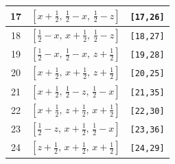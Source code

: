 \documentclass[fleqn,8pt]{jsarticle}
\begin{document}
\begin{longtable}{ccc}
17 & $\left[ x + \frac{1}{2},\, \frac{1}{2} - x,\, \frac{1}{2} - z \right]$ & {\tt [17,26]} \\ \hline
18 & $\left[ \frac{1}{2} - x,\, x + \frac{1}{2},\, \frac{1}{2} - z \right]$ & {\tt [18,27]} \\ \hline
19 & $\left[ \frac{1}{2} - x,\, \frac{1}{2} - x,\, z + \frac{1}{2} \right]$ & {\tt [19,28]} \\ \hline
20 & $\left[ x + \frac{1}{2},\, x + \frac{1}{2},\, z + \frac{1}{2} \right]$ & {\tt [20,25]} \\ \hline
21 & $\left[ x + \frac{1}{2},\, \frac{1}{2} - z,\, \frac{1}{2} - x \right]$ & {\tt [21,35]} \\ \hline
22 & $\left[ x + \frac{1}{2},\, z + \frac{1}{2},\, x + \frac{1}{2} \right]$ & {\tt [22,30]} \\ \hline
23 & $\left[ \frac{1}{2} - z,\, x + \frac{1}{2},\, \frac{1}{2} - x \right]$ & {\tt [23,36]} \\ \hline
24 & $\left[ z + \frac{1}{2},\, x + \frac{1}{2},\, x + \frac{1}{2} \right]$ & {\tt [24,29]} \\
\end{longtable}
\renewcommand{\arraystretch}{1.2}
\end{document}
